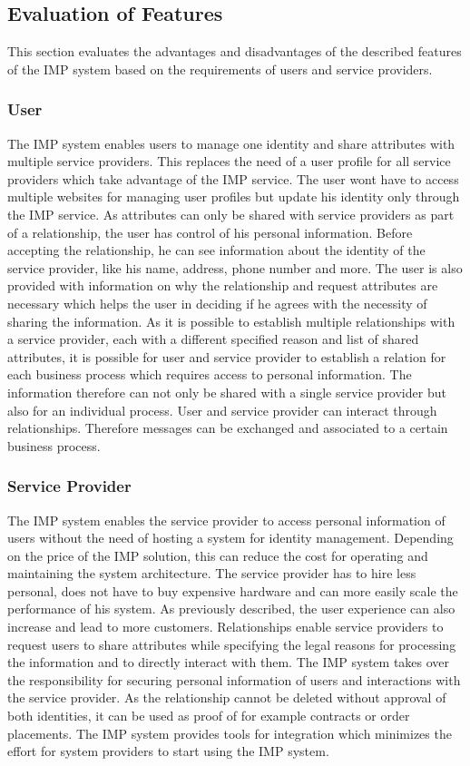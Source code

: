 \subsection{Evaluation of Features}

This section evaluates the advantages and disadvantages of the described features of the IMP system based on the requirements of users and service providers.

\subsubsection{User}
The IMP system enables users to manage one identity and share attributes with multiple service providers. This replaces the need of a user profile for all service providers which take advantage of the IMP service. The user wont have to access multiple websites for managing user profiles but update his identity only through the IMP service.
As attributes can only be shared with service providers as part of a relationship, the user has control of his personal information. Before accepting the relationship, he can see information about the identity of the service provider, like his name, address, phone number and more. The user is also provided with information on why the relationship and request attributes are necessary which helps the user in deciding if he agrees with the necessity of sharing the information. As it is possible to establish multiple relationships with a service provider, each with a different specified reason and list of shared attributes, it is possible for user and service provider to establish a relation for each business process which requires access to personal information. The information therefore can not only be shared with a single service provider but also for an individual process. User and service provider can interact through relationships. Therefore messages can be exchanged and associated to a certain business process.

\subsubsection{Service Provider}

The IMP system enables the service provider to access personal information of users without the need of hosting a system for identity management. Depending on the price of the IMP solution, this can reduce the cost for operating and maintaining the system architecture. The service provider has to hire less personal, does not have to buy expensive hardware and can more easily scale the performance of his system. As previously described, the user experience can also increase and lead to more customers. Relationships enable service providers to request users to share attributes while specifying the legal reasons for processing the information and to directly interact with them. The IMP system takes over the responsibility for securing personal information of users and interactions with the service provider. As the relationship cannot be deleted without approval of both identities, it can be used as proof of for example contracts or order placements. The IMP system provides tools for integration which minimizes the effort for system providers to start using the IMP system.

